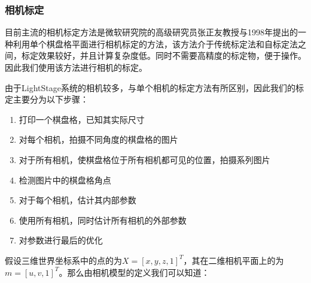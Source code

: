 \subsubsection{相机标定}
目前主流的相机标定方法是微软研究院的高级研究员张正友教授与1998年提出的一种利用单个棋盘格平面进行相机标定的方法，该方法介于传统标定法和自标定法之间，标定效果较好，并且计算复杂度低。同时不需要高精度的标定物，便于操作。因此我们使用该方法进行相机的标定。

由于LightStage系统的相机较多，与单个相机的标定方法有所区别，因此我们的标定主要分为以下步骤：
\begin{enumerate}
    \item 打印一个棋盘格，已知其实际尺寸
    \item 对每个相机，拍摄不同角度的棋盘格的图片
    \item 对于所有相机，使棋盘格位于所有相机都可见的位置，拍摄系列图片
    \item 检测图片中的棋盘格角点
    \item 对于每个相机，估计其内部参数
    \item 使用所有相机，同时估计所有相机的外部参数
    \item 对参数进行最后的优化
\end{enumerate}

假设三维世界坐标系中的点的\qczb 为\(X = [x,y,z,1]^T\)，其在二维相机平面上的\qczb 为\(m = [u,v,1]^T\)。那么由相机模型的定义我们可以知道：

